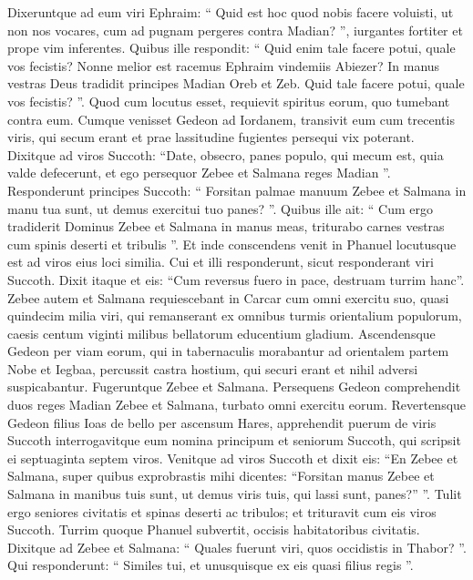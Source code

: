 \begin{biblechapter}
\begin{biblechapter}
\begin{biblechapter}
\begin{biblechapter}
\begin{biblechapter}
\begin{biblechapter}
\begin{biblechapter}
\begin{biblechapter}
\verse Dixeruntque ad eum viri Ephraim: “ Quid est hoc quod nobis facere voluisti, ut non nos vocares, cum ad pugnam pergeres contra Madian? ”, iurgantes fortiter et prope vim inferentes. 
\verse Quibus ille respondit: “ Quid enim tale facere potui, quale vos fecistis? Nonne melior est racemus Ephraim vindemiis Abiezer? 
\verse In manus vestras Deus tradidit principes Madian Oreb et Zeb. Quid tale facere potui, quale vos fecistis? ”. Quod cum locutus esset, requievit spiritus eorum, quo tumebant contra eum.
 \verse Cumque venisset Gedeon ad Iordanem, transivit eum cum trecentis viris, qui secum erant et prae lassitudine fugientes persequi vix poterant. 
\verse Dixitque ad viros Succoth: “Date, obsecro, panes populo, qui mecum est, quia valde defecerunt, et ego persequor Zebee et Salmana reges Madian ”. 
\verse Responderunt principes Succoth: “ Forsitan palmae manuum Zebee et Salmana in manu tua sunt, ut demus exercitui tuo panes? ”. 
\verse Quibus ille ait: “ Cum ergo tradiderit Dominus Zebee et Salmana in manus meas, triturabo carnes vestras cum spinis deserti et tribulis ”. 
\verse Et inde conscendens venit in Phanuel locutusque est ad viros eius loci similia. Cui et illi responderunt, sicut responderant viri Succoth. 
\verse Dixit itaque et eis: “Cum reversus fuero in pace, destruam turrim hanc”.
 \verse Zebee autem et Salmana requiescebant in Carcar cum omni exercitu suo, quasi quindecim milia viri, qui remanserant ex omnibus turmis orientalium populorum, caesis centum viginti milibus bellatorum educentium gladium. 
\verse Ascendensque Gedeon per viam eorum, qui in tabernaculis morabantur ad orientalem partem Nobe et Iegbaa, percussit castra hostium, qui securi erant et nihil adversi suspicabantur. 
\verse Fugeruntque Zebee et Salmana. Persequens Gedeon comprehendit duos reges Madian Zebee et Salmana, turbato omni exercitu eorum.
 \verse Revertensque Gedeon filius Ioas de bello per ascensum Hares, 
\verse apprehendit puerum de viris Succoth interrogavitque eum nomina principum et seniorum Succoth, qui scripsit ei septuaginta septem viros. 
\verse Venitque ad viros Succoth et dixit eis: “En Zebee et Salmana, super quibus exprobrastis mihi dicentes: “Forsitan manus Zebee et Salmana in manibus tuis sunt, ut demus viris tuis, qui lassi sunt, panes?” ”. 
\verse Tulit ergo seniores civitatis et spinas deserti ac tribulos; et trituravit cum eis viros Succoth. 
\verse Turrim quoque Phanuel subvertit, occisis habitatoribus civitatis.
 \verse Dixitque ad Zebee et Salmana: “ Quales fuerunt viri, quos occidistis in Thabor? ”. Qui responderunt: “ Similes tui, et unusquisque ex eis quasi filius regis ”. 

\end{biblechapter}
\end{biblechapter}
\end{biblechapter}
\end{biblechapter}
\end{biblechapter}
\end{biblechapter}
\end{biblechapter}
\end{biblechapter}

